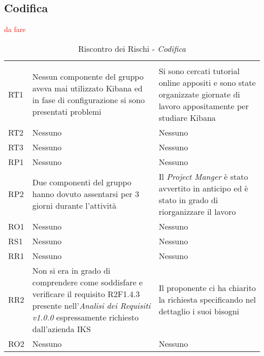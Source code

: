 \subsection{Codifica}
\label{sec:CodificaRischi}
\textcolor{red}{da fare}
\begin{table}[H]
	\centering
	\begin{tabular}{|C{2.5cm}|C{5cm}|C{5cm}|}
		 & & \\
		RT1  & Nessun componente del gruppo aveva mai utilizzato Kibana ed in fase di configurazione si sono presentati problemi & Si sono cercati tutorial online appositi e sono state organizzate giornate di lavoro appositamente per studiare Kibana \\
		\hline
		RT2  & Nessuno & Nessuno \\
		\hline
		RT3  & Nessuno & Nessuno \\
		\hline
		RP1  & Nessuno & Nessuno \\
		\hline
		RP2  & Due componenti del gruppo hanno dovuto assentarsi per 3 giorni durante l'attività & Il \textit{Project Manger} è stato avvertito in anticipo ed è stato in grado di riorganizzare il lavoro \\
		\hline
		RO1  & Nessuno & Nessuno \\
		\hline
		RS1  & Nessuno & Nessuno \\
		\hline
		RR1  & Nessuno & Nessuno \\
		\hline
		RR2  & Non si era in grado di comprendere come soddisfare e verificare il requisito R2F1.4.3 presente nell'\textit{Analisi dei Requisiti v1.0.0} espressamente richiesto dall'azienda IKS & Il proponente ci ha chiarito la richiesta specificando nel dettaglio i suoi bisogni\\
		\hline
		RO2  & Nessuno & Nessuno \\
		\hline
	\end{tabular}
	\caption{Riscontro dei Rischi - \textit{Codifica}}
\end{table}
